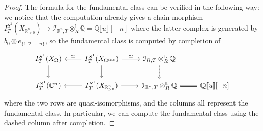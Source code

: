 \documentclass[11pt]{amsart}
\numberwithin{equation}{section}
\theoremstyle{plain}
\theoremstyle{definition}
\theoremstyle{remark}
\newcommand{\bC} { {\mathbb{C}}}
\newcommand{\bQ} { {\mathbb{Q}}}
\newcommand{\bR} { {\mathbb{R}}}
\newcommand{\fpw}[1]{{\llbracket #1\rrbracket}}
\begin{document}
\begin{proof}
The formula for the fundamental class can be verified in the following way: we notice that the computation already gives a chain morphism $I^{S^1}_T(X_{\bR^n_{>0}})  \to {\mathcal{I}}_{\bR^n,T}\otimes^\mathbb{L}_R\bQ = \bQ\fpw{u}[-n]$ where the latter complex is generated by $b_0\otimes e_{\{1,2,\cdots,n\}}$, so the fundamental class is computed by completion of
\[\begin{tikzcd}
{I}^{S^1}_T(X_{\Omega}) \arrow[d] & {I}^{S^1}_T(X_{\Omega^{int}}) \arrow[r,"\simeq"] \arrow[d] \arrow[l,"\simeq" above] & {{\mathcal{I}}_{\Omega,T}\otimes^\mathbb{L}_R\bQ} \arrow[d, dashed] &                                                  \\
I^{S^1}_T(\bC^n)                  & I^{S^1}_T(X_{\bR^n_{>0}})  \arrow[r] \arrow[l]                 & {{\mathcal{I}}_{\bR^n,T}\otimes^\mathbb{L}_R\bQ } \arrow[r, equal]    & {\bQ\fpw{u}[-n]}
\end{tikzcd}\]
where the two rows are quasi-isomorphisms, and the columns all represent the fundamental class. In particular, we can compute the fundamental class using the dashed column after completion.
\end{proof}
\end{document}
